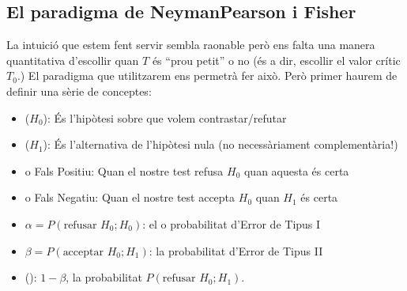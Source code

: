 \documentclass[letterpaper,10pt,english]{sphinxmanual}
\begin{document}
\subsection{El paradigma de Neyman\sphinxhyphen{}Pearson i Fisher}
\label{\detokenize{0_Intro/0_4_Tests:el-paradigma-de-neyman-pearson-i-fisher}}
La intuició que estem fent servir sembla raonable però ens falta una manera quantitativa
d’escollir quan \(T\) és “prou petit” o no (és a dir, escollir el valor crític \(T_0\).)
El paradigma que utilitzarem ens permetrà fer això. Però primer haurem de definir una sèrie de conceptes:
\begin{itemize}
\item {} 
 (\(H_0\)): És l’hipòtesi sobre  que volem contrastar/refutar

\item {} 
 (\(H_1\)): És l’alternativa de l’hipòtesi nula (no necessàriament complementària!)

\item {} 
 o Fals Positiu: Quan el nostre test refusa \(H_0\) quan aquesta és certa

\item {} 
 o Fals Negatiu: Quan el nostre test accepta \(H_0\) quan \(H_1\) és certa

\item {} 
\(\alpha = P(\mbox{refusar } H_0 ; H_0)\): el  o probabilitat d’Error de Tipus I

\item {} 
\(\beta = P(\mbox{acceptar } H_0 ; H_1)\): la probabilitat d’Error de Tipus II

\item {} 
 (): \(1 - \beta\), la probabilitat \(P(\mbox{refusar } H_0 ; H_1)\).

\end{itemize}
\end{document}

